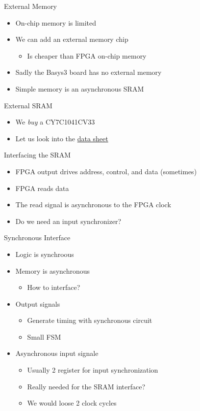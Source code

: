 \begin{frame}[fragile]{External Memory}
\begin{itemize}
\item On-chip memory is limited
\item We can add an external memory chip
\begin{itemize}
\item Is cheaper than FPGA on-chip memory
\end{itemize}
\item Sadly the Basys3 board has no external memory
\item Simple memory is an asynchronous SRAM
\end{itemize}
\end{frame}

\begin{frame}[fragile]{External SRAM}
\begin{itemize}
\item We \emph{buy} a CY7C1041CV33
\item Let us look into the \href{https://cn.inside.dtu.dk/cnnet/filesharing/download/618360ca-01b4-42e4-86e2-765835963deb}{data sheet}
\end{itemize}
\end{frame}

\begin{frame}[fragile]{Interfacing the SRAM}
\begin{itemize}
\item FPGA output drives address, control, and data (sometimes)
\item FPGA reads data
\item The read signal is asynchronous to the FPGA clock
\item Do we need an input synchronizer?
\end{itemize}
\end{frame}

\begin{frame}[fragile]{Synchronous Interface}
\begin{itemize}
\item Logic is synchroous
\item Memory is asynchronous
\begin{itemize}
\item How to interface?
\end{itemize}
\item Output signals
\begin{itemize}
\item Generate timing with synchronous circuit
\item Small FSM
\end{itemize}
\item Asynchronous input signale
\begin{itemize}
\item Usually 2 register for input synchronization
\item Really needed for the SRAM interface?
\item We would loose 2 clock cycles
\end{itemize}
\end{itemize}
\end{frame}


